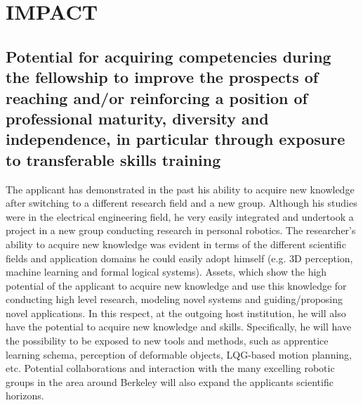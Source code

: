 \section{IMPACT} %
\label{sec:impact}
\subsection{Potential for acquiring competencies during the fellowship to improve the prospects of 
reaching and/or reinforcing a position of professional maturity, diversity and independence, 
in particular through exposure to transferable skills training}
The applicant has demonstrated in the past his ability
to acquire new knowledge after switching to a different research field
and  a  new  group.  Although  his  studies  were  in  the  electrical
engineering field,  he very easily integrated and  undertook a project
in  a  new  group   conducting  research  in  personal  robotics.  The
researcher's ability to  acquire new knowledge was evident  in terms of
the  different  scientific fields  and  application  domains he  could
easily  adopt  himself  (e.g.  3D  perception,  machine  learning  and
formal logical systems). Assets,  which  show the  high  potential of  the
applicant  to  acquire  new  knowledge  and  use  this  knowledge  for
conducting   high   level  research,   modeling   novel  systems   and
guiding/proposing novel applications. In this respect, at the outgoing
host  institution, he  will also  have  the potential  to acquire  new
knowledge and skills. Specifically, he will have the possibility to be
exposed to new tools and  methods, such as apprentice learning schema,
perception  of   deformable  objects, LQG-based motion planning, etc.  
Potential   collaborations  and interaction with the many excelling  robotic groups in the area around
Berkeley will also expand the applicants scientific horizons.
 
